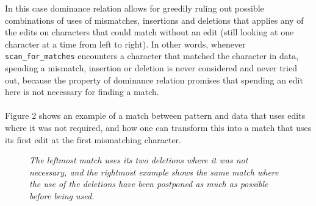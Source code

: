 \documentclass[12pt]{article}
\newcommand{\scm}{\texttt{scan\_for\_matches} }
\begin{document}
In this case dominance relation allows for greedily ruling out possible combinations of uses of 
mismatches, insertions and deletions that applies any of the edits on characters that could match without an edit 
(still looking at one character at a time from left to right). In other words, whenever \scm
encounters a character that matched the character in data, spending a mismatch, insertion or deletion is never
considered and never tried out, because the property of dominance relation promises that spending an edit
here is not necessary for finding a match. \\ \\
Figure 2 shows an example of a match between pattern and data that uses edits where it was not required,
and how one can transform this into a match that uses its first edit at the first mismatching character.
\begin{figure}[H]
\caption{\textit{The leftmost match uses its two deletions where it was not necessary, and the rightmost example shows
the same match where the use of the deletions have been postponed as much as possible before being used.}}
\end{figure} 
\end{document}
